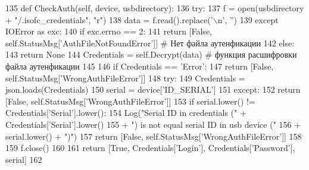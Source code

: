 \begin{DoxyCode}
135     \textcolor{keyword}{def }CheckAuth(self, device, usbdirectory):
136         \textcolor{keywordflow}{try}:
137             f = open(usbdirectory + \textcolor{stringliteral}{"/.isofc\_credentials"}, \textcolor{stringliteral}{"r")}
138 \textcolor{stringliteral}{            data = f.read().replace('\(\backslash\)n'}, \textcolor{stringliteral}{''})
139         \textcolor{keywordflow}{except} IOError \textcolor{keyword}{as} exc:
140             \textcolor{keywordflow}{if} exc.errno == 2:
141                 \textcolor{keywordflow}{return} [\textcolor{keyword}{False}, self.StatusMsg[\textcolor{stringliteral}{'AuthFileNotFoundError'}]] \textcolor{comment}{# Нет файла аутенфикации}
142             \textcolor{keywordflow}{else}:
143                 \textcolor{keywordflow}{return} \textcolor{keywordtype}{None}
144         Credentials = self.Decrypt(data) \textcolor{comment}{# функция расшифровки файла аутенфикации}
145 
146         \textcolor{keywordflow}{if} Credentials == \textcolor{stringliteral}{'Error'}:
147             \textcolor{keywordflow}{return} [\textcolor{keyword}{False}, self.StatusMsg[\textcolor{stringliteral}{'WrongAuthFileError'}]]
148         \textcolor{keywordflow}{try}:
149             Credentials = json.loads(Credentials)
150             serial = device[\textcolor{stringliteral}{'ID\_SERIAL'}]
151         \textcolor{keywordflow}{except}:
152             \textcolor{keywordflow}{return} [\textcolor{keyword}{False}, self.StatusMsg[\textcolor{stringliteral}{'WrongAuthFileError'}]]
153         \textcolor{keywordflow}{if} serial.lower() != Credentials[\textcolor{stringliteral}{'Serial'}].lower():
154             Log(\textcolor{stringliteral}{"Serial ID in credentials ("} + Credentials[\textcolor{stringliteral}{'Serial'}].lower()
155                 + \textcolor{stringliteral}{") is not equal serial ID in usb device ("}
156                 +  serial.lower() + \textcolor{stringliteral}{")"})
157             \textcolor{keywordflow}{return} [\textcolor{keyword}{False}, self.StatusMsg[\textcolor{stringliteral}{'WrongAuthFileError'}]]
158 
159         f.close()
160 
161         \textcolor{keywordflow}{return} [\textcolor{keyword}{True}, Credentials[\textcolor{stringliteral}{'Login'}], Credentials[\textcolor{stringliteral}{'Password'}], serial]
162 
\end{DoxyCode}
\mbox{\label{classisofc-service_1_1DeviceHandler_a3a5203ad41382b069d77e6fa783253fc}} 
